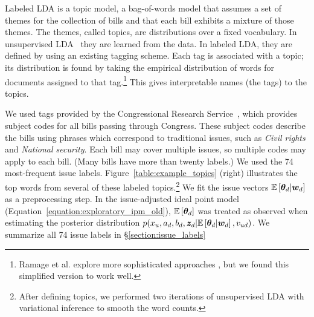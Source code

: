 Labeled LDA is a topic model, a bag-of-words model that assumes a set
of themes for the collection of bills and that each bill exhibits a
mixture of those themes.  The themes, called topics, are distributions
over a fixed vocabulary.  In unsupervised LDA~\cite{blei:2003} they
are learned from the data.  In labeled LDA, they are defined by using
an existing tagging scheme.  Each tag is associated with a topic; its
distribution is found by taking the empirical distribution of words
for documents assigned to that tag.\footnote{Ramage et al.  explore
  more sophisticated approaches \cite{ramage:2009}, but we found this
  simplified version to work well.}  This gives
interpretable names (the tags) to the topics.

We used tags provided by the Congressional Research
Service~\cite{crs:2011}, which provides subject codes for all bills
passing through Congress.  These subject codes describe the bills
using phrases which correspond to traditional issues, such as
\emph{Civil rights} and \emph{National security}. Each bill may cover
multiple issues, so multiple codes may apply to each bill. (Many bills
have more than twenty labels.)  We used the 74 most-frequent issue
labels. Figure~\ref{table:example_topics} (right) illustrates the top
words from several of these labeled topics.\footnote{After defining
  topics, we performed two iterations of unsupervised LDA with
  variational inference to smooth the word counts.} We fit the issue
vectors $\mathbb{E}\left[\bm \theta_d | \bm w_d\right]$ as a preprocessing step.  In
the issue-adjusted ideal point model
(Equation~\ref{equation:exploratory_ipm_old}), $\mathbb{E}\left[\bm \theta_d\right]$
was treated as observed when estimating the posterior distribution
$p(x_u, a_d, b_d, \bm z_d | \mathbb{E}\left[\bm \theta_d | \bm w_d\right],
v_{ud})$. We summarize all 74 issue labels in \S \ref{section:issue_labels}



